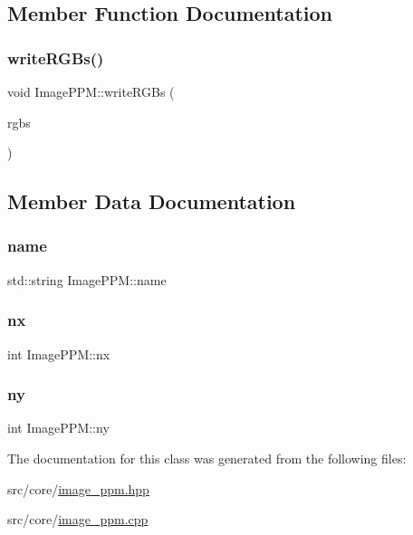 \subsection{Member Function Documentation}
\mbox{\label{classImagePPM_a63b4143e85d5c2bd5a2dcfaabb53c4ce}} 
\subsubsection{\texorpdfstring{writeRGBs()}{writeRGBs()}}
{\footnotesize\ttfamily void Image\+P\+P\+M\+::write\+R\+G\+Bs (\begin{DoxyParamCaption}\item[{std\+::vector$<$ \mbox{\hyperlink{structfilm_1_1RGB}{film\+::\+R\+GB}} $>$ \&}]{rgbs }\end{DoxyParamCaption})}



\subsection{Member Data Documentation}
\mbox{\label{classImagePPM_a5d51ed55062c7c4e462f96407dac2bec}} 
\subsubsection{\texorpdfstring{name}{name}}
{\footnotesize\ttfamily std\+::string Image\+P\+P\+M\+::name}

\mbox{\label{classImagePPM_a7d656e1c3551fa1ce5635ff3f205f805}} 
\subsubsection{\texorpdfstring{nx}{nx}}
{\footnotesize\ttfamily int Image\+P\+P\+M\+::nx}

\mbox{\label{classImagePPM_a485d31f3eff0b4bd64d2a5e31e5b8503}} 
\subsubsection{\texorpdfstring{ny}{ny}}
{\footnotesize\ttfamily int Image\+P\+P\+M\+::ny}



The documentation for this class was generated from the following files\+:\begin{DoxyCompactItemize}
\item 
src/core/\mbox{\hyperlink{image__ppm_8hpp}{image\+\_\+ppm.\+hpp}}\item 
src/core/\mbox{\hyperlink{image__ppm_8cpp}{image\+\_\+ppm.\+cpp}}\end{DoxyCompactItemize}
